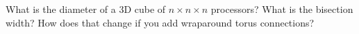   What is the diameter of a 3D cube of $n\times n\times n$ processors? What is the
  bisection width? How does that change if you add wraparound torus
  connections?
